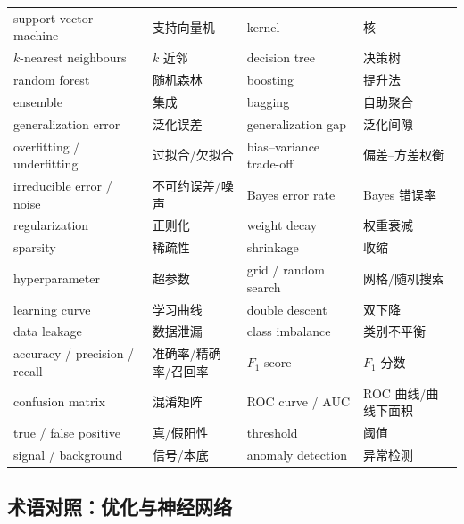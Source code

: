 \documentclass[UTF8,a4paper,11pt]{ctexart}
\theoremstyle{definition}
\theoremstyle{plain}
\theoremstyle{remark}
\begin{document}
\begin{center}
\begin{tabular}{@{}llll@{}}
support vector machine & 支持向量机 & kernel & 核\\
$k$-nearest neighbours & $k$ 近邻 & decision tree & 决策树\\
random forest & 随机森林 & boosting & 提升法\\
ensemble & 集成 & bagging & 自助聚合\\
generalization error & 泛化误差 & generalization gap & 泛化间隙\\
overfitting / underfitting & 过拟合/欠拟合 & bias--variance trade-off & 偏差--方差权衡\\
irreducible error / noise & 不可约误差/噪声 & Bayes error rate & Bayes 错误率\\
regularization & 正则化 & weight decay & 权重衰减\\
sparsity & 稀疏性 & shrinkage & 收缩\\
hyperparameter & 超参数 & grid / random search & 网格/随机搜索\\
learning curve & 学习曲线 & double descent & 双下降\\
data leakage & 数据泄漏 & class imbalance & 类别不平衡\\
accuracy / precision / recall & 准确率/精确率/召回率 & $F_1$ score & $F_1$ 分数\\
confusion matrix & 混淆矩阵 & ROC curve / AUC & ROC 曲线/曲线下面积\\
true / false positive & 真/假阳性 & threshold & 阈值\\
signal / background & 信号/本底 & anomaly detection & 异常检测\\
\bottomrule
\end{tabular}
\end{center}

\subsection{术语对照：优化与神经网络}
\end{document}
